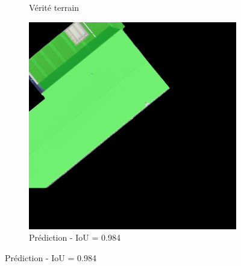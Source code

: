 \begin{figure}[H]
\begin{subfigure}{0.32\textwidth}
    \caption{Vérité terrain}
\end{subfigure}
\hfill
\begin{subfigure}{0.32\textwidth}
    \includegraphics[width=\textwidth]{02-main//figures/ch4/kfold_ensembles/segformer_tu-mambaout_base/best_cases/best_4_iou0.984_24931117_tile_18_5_f475a0_overlay_pred.png}
    \caption{Prédiction - IoU = 0.984}
\end{subfigure}

\vspace{0.35cm}


\end{figure}
